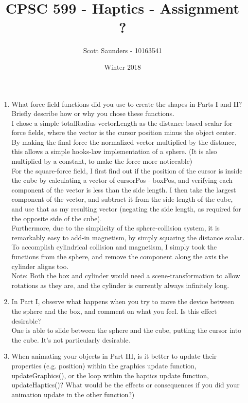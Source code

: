 \documentclass[oneside,letterpaper]{memoir}
\title{CPSC 599 - Haptics - Assignment ?}
\date{Winter 2018}
\author{Scott Saunders - 10163541}
\theoremstyle{definition}
\begin{document}
\maketitle
\begin{enumerate}
\item What force field functions did you use to create the shapes in Parts I and II? Briefly describe how or why you chose these functions. \\
I chose a simple totalRadius-vectorLength as the distance-based scalar for force fields, where the vector is the cursor position minus the object center. By making the final force the normalized vector multiplied by the distance, this allows a simple hooks-law implementation of a sphere. (It is also multiplied by a constant, to make the force more noticeable)\\
For the square-force field, I first find out if the position of the cursor is inside the cube by calculating a vector of cursorPos - boxPos, and verifying each component of the vector is less than the side length. I then take the largest component of the vector, and subtract it from the side-length of the cube, and use that as my resulting vector (negating the side length, as required for the opposite side of the cube). \\
Furthermore, due to the simplicity of the sphere-collision system, it is remarkably easy to add-in magnetism, by simply squaring the distance scalar.\\ 
To accomplish cylindrical collision and magnetism, I simply took the functions from the sphere, and remove the component along the axis the cylinder aligns too.\\
Note: Both the box and cylinder would need a scene-transformation to allow rotations as they are, and the cylinder is currently always infinitely long.
\item In Part I, observe what happens when you try to move the device between the sphere and the box, and comment on what you feel. Is this effect desirable? \\
One is able to slide between the sphere and the cube, putting the cursor into the cube. It's not particularly desirable.
\item When animating your objects in Part III, is it better to update their properties (e.g. position) within the graphics update function, updateGraphics(), or the loop within the haptics update function, updateHaptics()? What would be the effects or consequences if you did your animation update in the other function?) \\

\end{enumerate}
\end{document}
